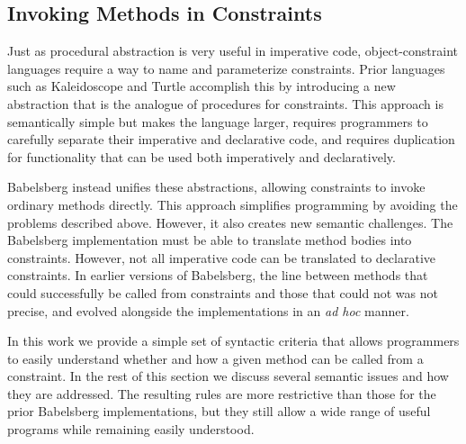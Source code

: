 \documentclass[10pt,reprint]{sigplanconf-preprint}
\begin{document}

\subsection{Invoking Methods in Constraints}
\label{sec:rules-constr-expr}

Just as procedural abstraction is very useful in imperative code,
object-constraint languages require a way to name and parameterize
constraints.  Prior languages such as Kaleidoscope
and Turtle accomplish this by introducing a new abstraction that is
the analogue of procedures for constraints.  
This approach is semantically simple but makes the language larger, requires programmers to
carefully separate their imperative and declarative code, and requires
duplication for functionality that can be used both imperatively
and declaratively.  

Babelsberg instead unifies these abstractions,
allowing constraints to invoke ordinary methods directly.
This approach simplifies programming by avoiding the problems
described above.  However, it also creates new semantic
challenges.  The Babelsberg implementation must be able to translate
method bodies into constraints.  However,  not all imperative code can
be translated to declarative constraints.  In earlier
versions of Babelsberg, the line between methods that could
successfully be called from constraints and those that could not was
not precise, and evolved alongside the implementations 
in an {\em ad hoc} manner.

In this work we provide a simple set of
syntactic criteria that allows programmers to easily understand
whether and how a given method can be called from a constraint.  In the
rest of this section we discuss several semantic issues and how they
are addressed.  The resulting rules are more restrictive than those
for the prior Babelsberg implementations, but they still
allow a wide range of useful programs while remaining easily understood.
\end{document}
